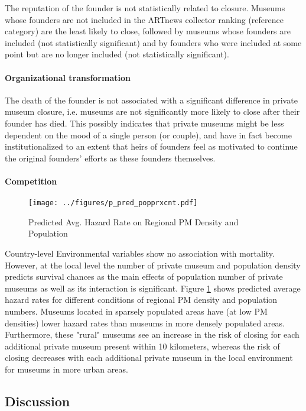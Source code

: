 \documentclass[12pt]{article}
\begin{document}
The reputation of the founder is not statistically related to closure. 
Museums whose founders are not included in the ARTnews collector ranking (reference category) are the least likely to close, followed by museums whose founders are included (not statistically significant) and by founders who were included at some point but are no longer included (not statistically significant).
\paragraph*{Organizational transformation}


The death of the founder is not associated with a significant difference in private museum closure, i.e. museums are not significantly more likely to close after their founder has died.
This possibly indicates that private museums might be less dependent on the mood of a single person (or couple), and have in fact become institutionalized to an extent that heirs of founders feel as motivated to continue the original founders' efforts as these founders themselves.
\paragraph*{Competition}

\begin{figure}[htbp]
\centering
\texttt{[image: ../figures/p\_pred\_popprxcnt.pdf]}
\caption{\label{fig:p_pred_popprxcnt}Predicted Avg. Hazard Rate on Regional PM Density and Population}
\end{figure}



Country-level Environmental variables show no association with mortality.
However, at the local level the number of private museum and population density predicts survival chances as the main effects of population number of private museums as well as its interaction is significant.
Figure \ref{fig:p_pred_popprxcnt} shows predicted average hazard rates for different conditions of regional PM density and population numbers.
Museums located in sparsely populated areas have (at low PM densities) lower hazard rates than museums in more densely populated areas. 
Furthermore, these "rural" museums see an increase in the risk of closing for each additional private museum present within 10 kilometers, whereas the risk of closing decreases with  each additional private museum in the local environment for museums in more urban areas. 
\subsection*{Discussion}
\end{document}
